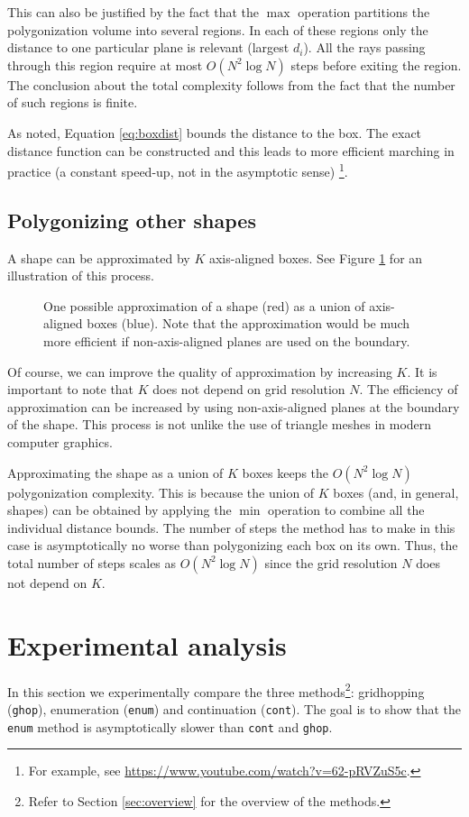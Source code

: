\documentclass[11pt,twocolumn]{article}
\begin{document}
			This can also be justified by the fact that the $\max$ operation partitions the polygonization volume into several regions.
			In each of these regions only the distance to one particular plane is relevant (largest $d_i$).
			All the rays passing through this region require at most $O(N^2\log N)$ steps before exiting the region.
			The conclusion about the total complexity follows from the fact that the number of such regions is finite.

			As noted, Equation \eqref{eq:boxdist} bounds the distance to the box.
			The exact distance function can be constructed and this leads to more efficient marching in practice
			(a constant speed-up, not in the asymptotic sense)
			\footnote{For example, see \url{https://www.youtube.com/watch?v=62-pRVZuS5c}.}.

		\subsection{Polygonizing other shapes}
			A shape can be approximated by $K$ axis-aligned boxes.
			See Figure \ref{fig:boxapprox} for an illustration of this process.
			\begin{figure}
				\centering
				\resizebox{0.5\textwidth}{!}
				{
					
				}
				\caption
				{
					One possible approximation of a shape (red) as a union of axis-aligned boxes (blue).
					Note that the approximation would be much more efficient if non-axis-aligned planes are used on the boundary.
				}
				\label{fig:boxapprox}
			\end{figure}
			Of course, we can improve the quality of approximation by increasing $K$.
			It is important to note that $K$ does not depend on grid resolution $N$.
			The efficiency of approximation can be increased by using non-axis-aligned planes at the boundary of the shape.
			This process is not unlike the use of triangle meshes in modern computer graphics.

			Approximating the shape as a union of $K$ boxes keeps the $O(N^2\log N)$ polygonization complexity.
			This is because the union of $K$ boxes (and, in general, shapes) can be obtained by applying the $\min$ operation to combine all the individual distance bounds.
			The number of steps the method has to make in this case is asymptotically no worse than polygonizing each box on its own.
			Thus, the total number of steps scales as $O(N^2\log N)$ since the grid resolution $N$ does not depend on $K$.

	\section{Experimental analysis}\label{sec:experiments}
		In this section we experimentally compare the three methods\footnote{Refer to Section \ref{sec:overview} for the overview of the methods.}: gridhopping (\texttt{ghop}), enumeration (\texttt{enum}) and continuation (\texttt{cont}).
		The goal is to show that the \texttt{enum} method is asymptotically slower than \texttt{cont} and \texttt{ghop}.
\end{document}
